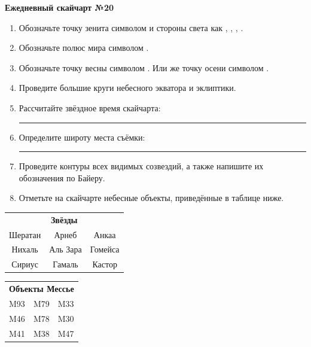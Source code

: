 \documentclass{./SAS-class-skygen}
\begin{document}
    
    
    
	\begin{center}
		\large\textbf{Ежедневный скайчарт №20}
	\end{center}

	\begin{enumerate}
		\item Обозначьте точку зенита символом  и стороны света как , , , .
		\item Обозначьте полюс мира символом .
		\item Обозначьте точку весны символом \Aries. Или же точку осени символом \Libra.
		\item Проведите большие круги небесного экватора и эклиптики.
		\item Рассчитайте звёздное время скайчарта: \rule{2cm}{0.4pt}
		\item Определите широту места съёмки: \rule{2cm}{0.4pt}
		\item Проведите контуры всех видимых созвездий, а также напишите их обозначения по Байеру.
		\item Отметьте на скайчарте небесные объекты, приведённые в таблице ниже.
	\end{enumerate}
	
    \vspace{0.5cm}

    \begin{table}[h!]
    \centering
    \begin{tabular}{ccc}
    \multicolumn{3}{c}{\textbf{Звёзды}} \\ Шератан & Арнеб & Анкаа \\
Нихаль & Аль Зара & Гомейса \\
Сириус & Гамаль & Кастор \\

\end{tabular}
    \hfill
    \begin{tabular}{ccc}
    \multicolumn{3}{c}{\textbf{Объекты Мессье}} \\ M93 & M79 & M33 \\
M46 & M78 & M30 \\
M41 & M38 & M47 \\

\end{tabular}
    \end{table}
	
\end{document}
